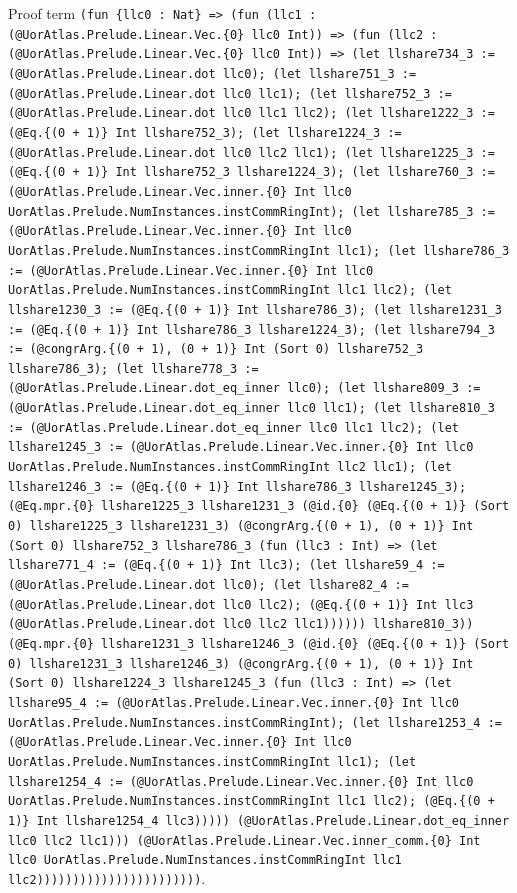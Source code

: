 \documentclass[11pt]{article}
\begin{document}
\noindent Proof term \texttt{(fun \{llc0 : Nat\} => (fun (llc1 : (@UorAtlas.Prelude.Linear.Vec.\{0\} llc0 Int)) => (fun (llc2 : (@UorAtlas.Prelude.Linear.Vec.\{0\} llc0 Int)) => (let llshare734\_3 := (@UorAtlas.Prelude.Linear.dot llc0); (let llshare751\_3 := (@UorAtlas.Prelude.Linear.dot llc0 llc1); (let llshare752\_3 := (@UorAtlas.Prelude.Linear.dot llc0 llc1 llc2); (let llshare1222\_3 := (@Eq.\{(0 + 1)\} Int llshare752\_3); (let llshare1224\_3 := (@UorAtlas.Prelude.Linear.dot llc0 llc2 llc1); (let llshare1225\_3 := (@Eq.\{(0 + 1)\} Int llshare752\_3 llshare1224\_3); (let llshare760\_3 := (@UorAtlas.Prelude.Linear.Vec.inner.\{0\} Int llc0 UorAtlas.Prelude.NumInstances.instCommRingInt); (let llshare785\_3 := (@UorAtlas.Prelude.Linear.Vec.inner.\{0\} Int llc0 UorAtlas.Prelude.NumInstances.instCommRingInt llc1); (let llshare786\_3 := (@UorAtlas.Prelude.Linear.Vec.inner.\{0\} Int llc0 UorAtlas.Prelude.NumInstances.instCommRingInt llc1 llc2); (let llshare1230\_3 := (@Eq.\{(0 + 1)\} Int llshare786\_3); (let llshare1231\_3 := (@Eq.\{(0 + 1)\} Int llshare786\_3 llshare1224\_3); (let llshare794\_3 := (@congrArg.\{(0 + 1), (0 + 1)\} Int (Sort 0) llshare752\_3 llshare786\_3); (let llshare778\_3 := (@UorAtlas.Prelude.Linear.dot\_eq\_inner llc0); (let llshare809\_3 := (@UorAtlas.Prelude.Linear.dot\_eq\_inner llc0 llc1); (let llshare810\_3 := (@UorAtlas.Prelude.Linear.dot\_eq\_inner llc0 llc1 llc2); (let llshare1245\_3 := (@UorAtlas.Prelude.Linear.Vec.inner.\{0\} Int llc0 UorAtlas.Prelude.NumInstances.instCommRingInt llc2 llc1); (let llshare1246\_3 := (@Eq.\{(0 + 1)\} Int llshare786\_3 llshare1245\_3); (@Eq.mpr.\{0\} llshare1225\_3 llshare1231\_3 (@id.\{0\} (@Eq.\{(0 + 1)\} (Sort 0) llshare1225\_3 llshare1231\_3) (@congrArg.\{(0 + 1), (0 + 1)\} Int (Sort 0) llshare752\_3 llshare786\_3 (fun (llc3 : Int) => (let llshare771\_4 := (@Eq.\{(0 + 1)\} Int llc3); (let llshare59\_4 := (@UorAtlas.Prelude.Linear.dot llc0); (let llshare82\_4 := (@UorAtlas.Prelude.Linear.dot llc0 llc2); (@Eq.\{(0 + 1)\} Int llc3 (@UorAtlas.Prelude.Linear.dot llc0 llc2 llc1)))))) llshare810\_3)) (@Eq.mpr.\{0\} llshare1231\_3 llshare1246\_3 (@id.\{0\} (@Eq.\{(0 + 1)\} (Sort 0) llshare1231\_3 llshare1246\_3) (@congrArg.\{(0 + 1), (0 + 1)\} Int (Sort 0) llshare1224\_3 llshare1245\_3 (fun (llc3 : Int) => (let llshare95\_4 := (@UorAtlas.Prelude.Linear.Vec.inner.\{0\} Int llc0 UorAtlas.Prelude.NumInstances.instCommRingInt); (let llshare1253\_4 := (@UorAtlas.Prelude.Linear.Vec.inner.\{0\} Int llc0 UorAtlas.Prelude.NumInstances.instCommRingInt llc1); (let llshare1254\_4 := (@UorAtlas.Prelude.Linear.Vec.inner.\{0\} Int llc0 UorAtlas.Prelude.NumInstances.instCommRingInt llc1 llc2); (@Eq.\{(0 + 1)\} Int llshare1254\_4 llc3))))) (@UorAtlas.Prelude.Linear.dot\_eq\_inner llc0 llc2 llc1))) (@UorAtlas.Prelude.Linear.Vec.inner\_comm.\{0\} Int llc0 UorAtlas.Prelude.NumInstances.instCommRingInt llc1 llc2)))))))))))))))))))))))}.\par
\end{document}
